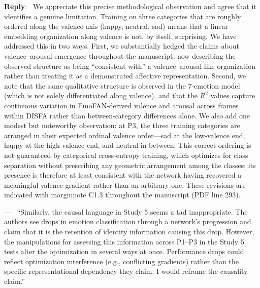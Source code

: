 \documentclass[11pt]{article}
\newcounter{reviewer}
\newcounter{point}[reviewer]
\renewcommand{\thepoint}{Comment\,\thereviewer.\arabic{point}}
\newenvironment{point}
   {\refstepcounter{point} \bigskip \noindent {\textbf{\thepoint} } ---\ }
   {\par }
\newenvironment{reply}
   {\medskip \noindent \color{blue} \begin{sf}\textbf{Reply}:\  }
   {\medskip \par \end{sf}}
\begin{document}
\begin{reply}
We appreciate this precise methodological observation and agree that it identifies a genuine limitation. Training on three categories that are roughly ordered along the valence axis (happy, neutral, sad) means that a linear embedding organization along valence is not, by itself, surprising. We have addressed this in two ways. First, we substantially hedged the claims about valence--arousal emergence throughout the manuscript, now describing the observed structure as being ``consistent with'' a valence--arousal-like organization rather than treating it as a demonstrated affective representation. Second, we note that the same qualitative structure is observed in the 7-emotion model (which is not solely differentiated along valence), and that the $R^2$ values capture continuous variation in EmoFAN-derived valence and arousal across frames within DISFA rather than between-category differences alone. We also add one modest but noteworthy observation: at \textsf{P3}, the three training categories are arranged in their expected ordinal valence order---sad at the low-valence end, happy at the high-valence end, and neutral in between. This correct ordering is not guaranteed by categorical cross-entropy training, which optimizes for class separation without prescribing any geometric arrangement among the classes; its presence is therefore at least consistent with the network having recovered a meaningful valence gradient rather than an arbitrary one. These revisions are indicated with marginnote C1.3 throughout the manuscript (PDF line 293).
\end{reply}

\begin{point}
``Similarly, the causal language in Study 5 seems a tad inappropriate. The authors see drops in emotion classification through a network's progression and claim that it is the retention of identity information causing this drop. However, the manipulations for assessing this information across P1--P3 in the Study 5 tests alter the optimization in several ways at once. Performance drops could reflect optimization interference (e.g., conflicting gradients) rather than the specific representational dependency they claim. I would reframe the causality claim.''
\label{comment_1_4}
\end{point}
\end{document}
